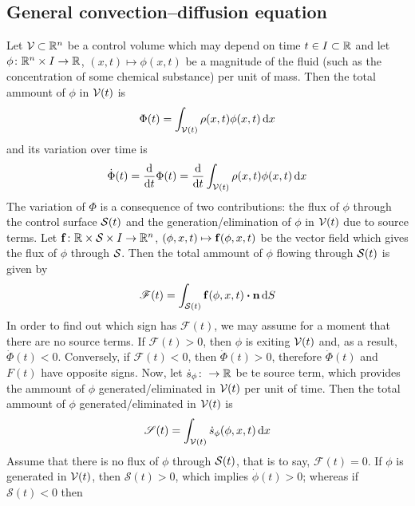 
\subsection{General convection--diffusion equation}

Let $\mathcal{V}_{} \subset \mathbb{R}^n$ be a control volume which may depend on time $t \in I \subset \mathbb{R}$ and let
$\phi \colon \mathbb{R}^n \times I \to \mathbb{R}$, $(x, t) \mapsto \phi(x, t)$
be a magnitude of the fluid (such as the concentration of some chemical
substance) per unit of mass. Then the total ammount of $\phi$ in ${\mathcal{V}(t)}$ is
\begin{equation*}
	\Phi(t) = 
	\int_{{\mathcal{V}(t)}} \rho(x, t) \phi(x, t) \dd{x}
\end{equation*}
and its variation over time is
\begin{equation*} \label{eq:general_cde_variation_Phi}
	\dot{\Phi}(t) =
	\frac{\dd}{\dd t} \Phi(t) = 
	\frac{\dd}{\dd{t}} \int_{{\mathcal{V}(t)}} \rho(x, t) \phi(x, t) \dd{x}
\end{equation*}
The variation of $\Phi$ is a consequence of two contributions: the flux of
$\phi$ through the control surface ${\mathcal{S}(t)}$ and the generation/elimination of
$\phi$ in ${\mathcal{V}(t)}$ due to source terms. Let $\vb{f} \colon \mathbb{R} \times \mathcal{S}_{}
\times I \rightarrow \mathbb{R}^n$, $(\phi, x, t) \mapsto \vb{f}(\phi, x,
t)$ be the vector field which gives the flux of $\phi$ through $\mathcal{S}_{}$. Then the
total ammount of $\phi$ flowing through ${\mathcal{S}(t)}$ is given by
\begin{equation*}
	\mathscr{F}(t) = \int_{\cst} \vb{f}(\phi, x, t) \vdot \vb{n} \dd{S}
\end{equation*}
In order to find out which sign has $\mathscr{F}(t)$, we may assume for a moment
that there are no source terms. If $\mathscr{F}(t) > 0$, then $\phi$ is exiting
${\mathcal{V}(t)}$ and, as a result, $\dot{\Phi}(t) < 0$. Conversely, if $\mathscr{F}(t) <
0$, then $\dot{\Phi}(t) > 0$, therefore $\dot{\Phi}(t)$ and $F(t)$ have opposite
signs. Now, let $\dot{s}_\phi \colon \rightarrow \mathbb{R}$ be te source term, which
provides the ammount of $\phi$ generated/eliminated in ${\mathcal{V}(t)}$ per unit of time.
Then the total ammount of $\phi$ generated/eliminated in ${\mathcal{V}(t)}$ is
\begin{equation*}
	\mathscr{S}(t) = \int_{{\mathcal{V}(t)}} \dot{s}_\phi (\phi, x, t) \dd{x}
\end{equation*}
Assume that there is no flux of $\phi$ through ${\mathcal{S}(t)}$, that is to say,
$\mathscr{F}(t) = 0$. If $\phi$ is generated in ${\mathcal{V}(t)}$, then $\mathscr{S}(t) >
0$, which implies $\dot{\phi}(t) > 0$; whereas if $\mathscr{S}(t) < 0$ then
